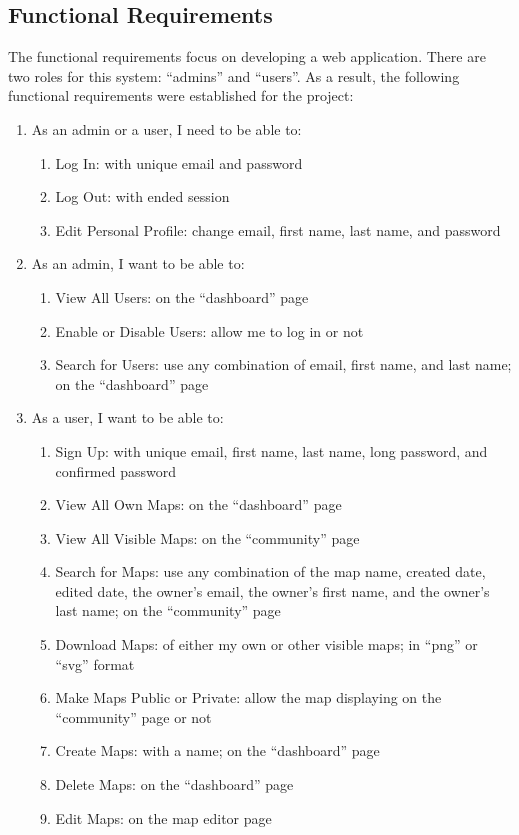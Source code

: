 \subsection{Functional Requirements}
\label{sec:Requirements>Functional Requirements}
The functional requirements focus on developing a web application. There are two roles for this system: ``admins'' and ``users''. As a result, the following functional requirements were established for the project:
\begin{enumerate}
  \item As an admin or a user, I need to be able to:
  \begin{enumerate}
    \item Log In: with unique email and password
    \item Log Out: with ended session
    \item Edit Personal Profile: change email, first name, last name, and password
  \end{enumerate}
  \item As an admin, I want to be able to:
  \begin{enumerate}
    \item View All Users: on the ``dashboard'' page
    \item Enable or Disable Users: allow me to log in or not
    \item Search for Users: use any combination of email, first name, and last name; on the ``dashboard'' page
  \end{enumerate}
  \item As a user, I want to be able to:
  \begin{enumerate}
    \item Sign Up: with unique email, first name, last name, long password, and confirmed password
    \item View All Own Maps: on the ``dashboard'' page
    \item View All Visible Maps: on the ``community'' page
    \item Search for Maps: use any combination of the map name, created date, edited date, the owner's email, the owner's first name, and the owner's last name; on the ``community'' page
    \item Download Maps: of either my own or other visible maps; in ``png'' or ``svg'' format
    \item Make Maps Public or Private: allow the map displaying on the ``community'' page or not
    \item Create Maps: with a name; on the ``dashboard'' page
    \item Delete Maps: on the ``dashboard'' page
    \item Edit Maps: on the map editor page
  \end{enumerate}
\end{enumerate}

